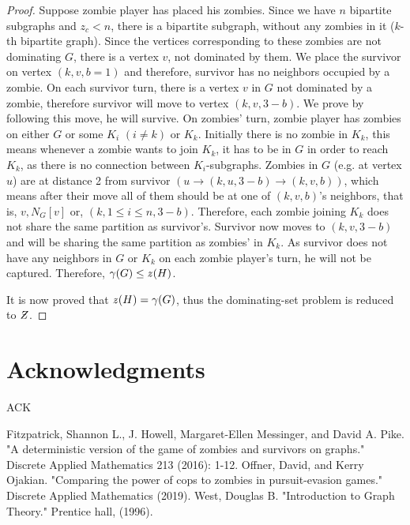 \documentclass[1p]{elsarticle}
\newcommand{\NPZ}{\ooalign{$Z$\cr\hfil\rule[.8ex]{.3em}{.09ex}\hfil\cr}}
\newcommand{\zn}{\ooalign{$z$\cr\hfil\rule[.5ex]{.2em}{.08ex}\hfil\cr}}
\begin{document}
\begin{proof}
		Suppose zombie player has placed his zombies. Since we have $n$ bipartite subgraphs and $z_c < n$, there is a
		bipartite subgraph, without any zombies in it ($k$-th bipartite graph). Since the vertices corresponding to
		these zombies are not dominating $G$, there is a vertex $v$, not dominated by them. We place the survivor on
		vertex $(k,v,b = 1)$ and therefore, survivor has no neighbors occupied by a zombie. On each survivor turn, there
		is a vertex $v$ in $G$ not dominated by a zombie, therefore survivor will move to vertex $(k,v,3 - b)$. We prove
		by following this move, he will survive. On zombies' turn, zombie player has zombies on either $G$ or some $K_i$
		$(i \neq k)$ or $K_k$. Initially there is no zombie in $K_k$, this means whenever a zombie wants to join $K_k$,
		it has to be in $G$ in order to reach $K_k$, as there is no connection between $K_i$-subgraphs. Zombies in $G$
		(e.g. at vertex $u$) are at distance 2 from survivor $(u \rightarrow (k,u,3 - b) \rightarrow (k,v,b))$, which
		means after their move all of them should be at one of $(k,v,b)$'s neighbors, that is, $v , N_G[v] $ or, $ (k,1
		\leq i \leq n,3 - b)$. Therefore, each zombie joining $K_k$ does not share the same partition as survivor's.
		Survivor now moves to $(k,v,3-b)$ and will be sharing the same partition as zombies' in $K_k$. As survivor does
		not have any neighbors in $G$ or $K_k$ on each zombie player's turn, he will not be captured. Therefore,
		$\gamma(G) \leq \zn(H)$.

		It is now proved that $\zn(H) = \gamma(G)$, thus the dominating-set problem is reduced to $\NPZ$.

	\end{proof}

	\section{Acknowledgments}\label{ack}
	ACK
\begin{thebibliography}{999}
	
	Fitzpatrick, Shannon L., J. Howell, Margaret-Ellen Messinger, and David A. Pike. "A deterministic version of the
	game of zombies and survivors on graphs." Discrete Applied Mathematics 213 (2016): 1-12.
	Offner, David, and Kerry Ojakian. "Comparing the power of cops to zombies in pursuit-evasion games." Discrete
	Applied Mathematics (2019).
	West, Douglas B. "Introduction to Graph Theory." Prentice hall, (1996).
\end{thebibliography}
\end{document}
